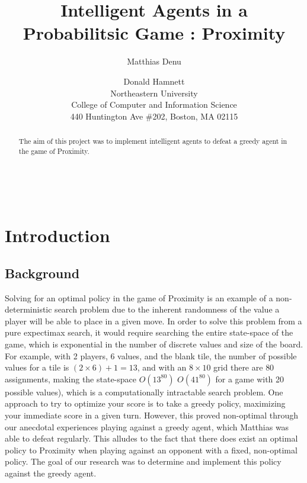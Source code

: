 \documentclass[letterpaper]{article}
\begin{document}
\setlength{pdfpagewidth}{8.5in}
\setlength{pdfpageheight}{11in}\\
%
%
%


\title{Intelligent Agents in a Probabilitsic Game : Proximity}
\author{Matthias Denu \and Donald Hamnett\\ 
Northeastern University \\ College of Computer and Information Science\\ 440 Huntington Ave \#202, Boston, MA 02115}

\maketitle 
\begin{abstract}
\par
The aim of this project was to implement intelligent agents to defeat a greedy agent in the game of Proximity.
\end{abstract}
\section{Introduction}
\par

\subsection{Background}
\par
Solving for an optimal policy in the game of Proximity is an example of a non-deterministic search problem due to the inherent randomness of the value 
a player will be able to place in a given move.  In order to solve this problem from a pure expectimax search, it would require searching the entire 
state-space of the game, which is exponential in the number of discrete values and size of the board. For example, with 2 players, 6 values, and the 
blank tile, the number of possible values for a tile is $(2\times6) + 1 = 13$, and with an $8\times10$ grid there are $80$ assignments, making the 
state-space $O(13^{80})$ $O(41^{80})$ for a game with 20 possible values), which is a computationally intractable search problem.  One approach to try to optimize your score is to take a greedy policy, maximizing your immediate score in a given turn. However, this proved non-optimal through our anecdotal experiences playing against a greedy agent, which Matthias was able to defeat regularly.  This alludes to the fact that there does exist an optimal policy to Proximity when playing against an opponent with a fixed, non-optimal policy. The goal of our research was to determine and implement 
this policy against the greedy agent.
\end{document}
